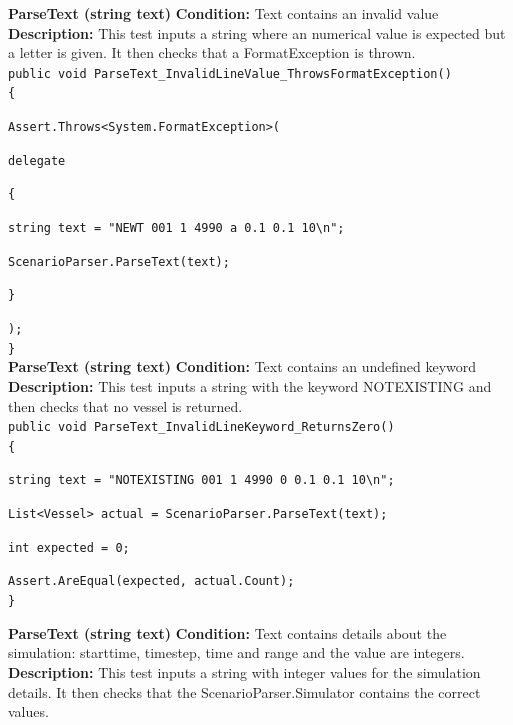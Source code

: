 \documentclass[12pt]{article}
\begin{document}
{\bfseries ParseText (string text)} \newline
{\bfseries Condition:} Text contains an invalid value \newline
{\bfseries Description:} This test inputs a string where an numerical value is expected but a letter is given. It then checks that a FormatException is thrown.\\
\vspace*{0.2in}
\texttt{public void ParseText\_InvalidLineValue\_ThrowsFormatException()}\\
\texttt{\{}\par
\texttt{Assert.Throws<System.FormatException>(}\par
\texttt{delegate}\par
\texttt{\{}\par
\texttt{string text = "NEWT 001              1   		 4990      			 a   			 0.1   		   	 	0.1 		  10\textbackslash n";}\par 
\texttt{ScenarioParser.ParseText(text);}\par
\texttt{\}}\par
\texttt{);}\\
\texttt{\}}\\



{\bfseries ParseText (string text)} \newline
{\bfseries Condition:} Text contains an undefined keyword \newline
{\bfseries Description:} This test inputs a string with the keyword NOTEXISTING and then checks that no vessel is returned.\\

\texttt{public void ParseText\_InvalidLineKeyword\_ReturnsZero()}\\
\texttt{\{}\par
\texttt{string text = "NOTEXISTING 001          1   	 4990      			 0   			 0.1   		   	 	0.1 		  10\textbackslash n";}\par
\texttt{List<Vessel> actual = ScenarioParser.ParseText(text);}\par
\texttt{int expected = 0;}\par     
\texttt{Assert.AreEqual(expected, actual.Count);}\\
\texttt{\}}



{\bfseries ParseText (string text)} \newline
{\bfseries Condition:} Text contains details about the simulation: starttime, timestep, time and range and the value are integers. \newline
{\bfseries Description:} This test inputs a string with integer values for the simulation details. It then checks that the ScenarioParser.Simulator contains the correct values.\\
\end{document}
